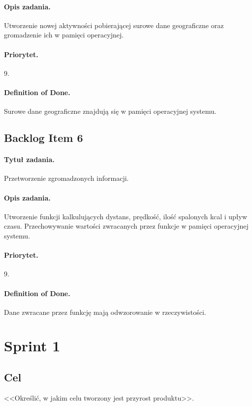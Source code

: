 \documentclass[a4paper]{article}
\begin{document}
\paragraph{Opis zadania.} Utworzenie nowej aktywności pobierającej surowe dane geograficzne oraz gromadzenie ich w pamięci operacyjnej.
\paragraph{Priorytet.} 9.
\paragraph{Definition of Done.} Surowe dane geograficzne znajdują się w pamięci operacyjnej systemu.

\subsection{Backlog Item 6}
\paragraph{Tytuł zadania.} Przetworzenie zgromadzonych informacji.
\paragraph{Opis zadania.} Utworzenie funkcji kalkulujących dystans, prędkość, ilość spalonych kcal i upływ czasu. Przechowywanie wartości zwracanych przez funkcje w pamięci operacyjnej systemu.
\paragraph{Priorytet.} 9.
\paragraph{Definition of Done.} Dane zwracane przez funkcję mają odwzorowanie w rzeczywistości.


\section{Sprint 1}
\subsection{Cel} <<Określić, w jakim celu tworzony jest przyrost produktu>>.
\end{document}
